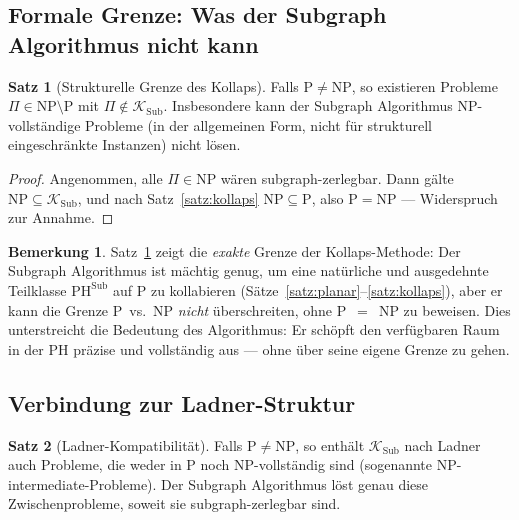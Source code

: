﻿\documentclass[a4paper,12pt]{article}
\theoremstyle{definition}
\newtheorem{satz}{Satz}
\newtheorem{bemerkung}{Bemerkung}
\begin{document}
\subsection{Formale Grenze: Was der Subgraph Algorithmus nicht kann}

\begin{satz}[Strukturelle Grenze des Kollaps]
\label{satz:grenze}
  Falls $\mathrm{P} \neq \mathrm{NP}$, so existieren Probleme
  $\Pi \in \mathrm{NP} \setminus \mathrm{P}$ mit $\Pi \notin \mathcal{K}_\mathrm{Sub}$.
  Insbesondere kann der Subgraph Algorithmus NP-vollständige Probleme
  (in der allgemeinen Form, nicht für strukturell eingeschränkte Instanzen)
  nicht lösen.
\end{satz}

\begin{proof}
  Angenommen, alle $\Pi \in \mathrm{NP}$ wären subgraph-zerlegbar.
  Dann gälte $\mathrm{NP} \subseteq \mathcal{K}_\mathrm{Sub}$,
  und nach Satz~\ref{satz:kollaps} $\mathrm{NP} \subseteq \mathrm{P}$,
  also $\mathrm{P} = \mathrm{NP}$ --- Widerspruch zur Annahme.
\end{proof}

\begin{bemerkung}
  Satz~\ref{satz:grenze} zeigt die \emph{exakte} Grenze der Kollaps-Methode:
  Der Subgraph Algorithmus ist mächtig genug, um eine natürliche und ausgedehnte
  Teilklasse $\mathrm{PH}^{\mathrm{Sub}}$ auf P zu kollabieren
  (Sätze~\ref{satz:planar}--\ref{satz:kollaps}),
  aber er kann die Grenze P~vs.~NP \emph{nicht} überschreiten, ohne P~$=$~NP zu beweisen.
  Dies unterstreicht die Bedeutung des Algorithmus: Er schöpft den verfügbaren
  Raum in der PH präzise und vollständig aus --- ohne über seine eigene Grenze zu gehen.
\end{bemerkung}

\subsection{Verbindung zur Ladner-Struktur}

\begin{satz}[Ladner-Kompatibilität]
\label{satz:ladner}
  Falls $\mathrm{P} \neq \mathrm{NP}$, so enthält $\mathcal{K}_\mathrm{Sub}$ nach
  Ladner~\cite{ladner1975structure} auch Probleme, die weder in P noch NP-vollständig sind
  (sogenannte NP-intermediate-Probleme).
  Der Subgraph Algorithmus löst genau diese Zwischenprobleme,
  soweit sie subgraph-zerlegbar sind.
\end{satz}
\end{document}
